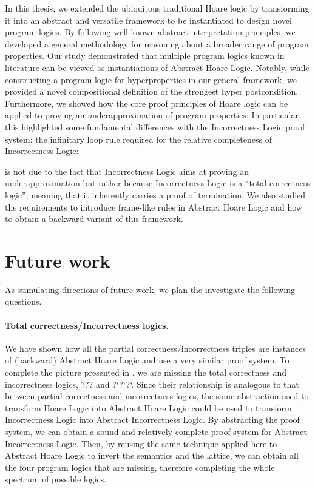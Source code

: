 \documentclass[
  10pt,       %
  twoside,    %
  a4paper,    %
  english,    %
  tikz,       %
  openright,  %
]{book}
\begin{document}
In this thesis, we extended the ubiquitous 
traditional Hoare logic by transforming it into an abstract and
versatile framework to be instantiated to design novel program logics. 
By following well-known abstract interpretation principles, 
we developed a general methodology for reasoning about a broader range of program properties.
Our study demonstrated that multiple program logics known in
literature can be viewed as instantiations of Abstract Hoare Logic. Notably, 
while constructing a program logic for hyperproperties in our general framework,
we provided a novel compositional definition of the strongest hyper
postcondition.
Furthermore, we showed how the core proof principles of Hoare logic can be
applied to proving an underapproximation of program properties. In particular, this highlighted
some fundamental differences with the Incorrectness Logic proof system: 
the infinitary loop rule required for the relative completeness of Incorrectness Logic:
%
\begin{prooftree}
\end{prooftree}
%
is not due to the fact that Incorrectness Logic aims at proving 
an underapproximation but rather
because Incorrectness Logic is  a ``total correctness logic'', meaning that it inherently carries 
a proof of termination.
We also studied the requirements to introduce frame-like rules in Abstract
Hoare Logic and how to obtain a backward variant of this framework. 

\section{Future work}
As stimulating directions of future work, we plan the investigate the 
following questions. 

\paragraph{\textbf{Total correctness/Incorrectness logics.}}
We have shown how all the partial correctness/incor\-rectness triples are
instances of (backward) Abstract Hoare Logic and use a very similar proof
system. To complete the picture presented in \cite{Zhang22}, we are missing the
total correctness and incorrectness logics, ??? and ?`?`?`. Since their
relationship is analogous to that between partial correctness and incorrectness
logics, the same abstraction used to transform Hoare Logic into Abstract Hoare
Logic could be used to transform Incorrectness Logic \cite{Moller21} into
Abstract Incorrectness Logic. By abstracting the proof system, we can obtain a
sound and relatively complete proof system for Abstract Incorrectness Logic.
Then, by reusing the same technique applied here to Abstract Hoare Logic to
invert the semantics and the lattice, we can obtain all the four program logics
that are missing, therefore completing the whole spectrum of possible logics.
\end{document}
